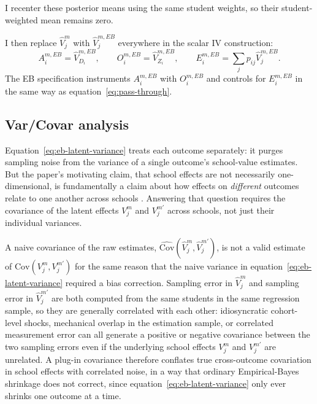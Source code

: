 \documentclass[a4paper, article, english, oneside, unknownkeysallowed, 12pt]{memoir}
\begin{document}
I recenter these posterior means using the same student weights, so their student-weighted mean remains zero.

I then replace $\widehat{V}_j^m$ with $\widehat{V}_{j}^{m,EB}$ everywhere in the scalar IV construction:
\begin{equation}
  A_i^{m,EB} = \widehat{V}_{D_i}^{m,EB},
  \qquad
  O_i^{m,EB} = \widehat{V}_{Z_i}^{m,EB},
  \qquad
  E_i^{m,EB} = \sum_j p_{ij}\widehat{V}_{j}^{m,EB}.
  \label{eq:eb-iv-objects}
\end{equation}
The EB specification instruments $A_i^{m,EB}$ with $O_i^{m,EB}$ and controls for $E_i^{m,EB}$ in the same way as equation~\eqref{eq:pass-through}.


\subsection{Var/Covar analysis}

Equation~\eqref{eq:eb-latent-variance} treats each outcome separately: it purges sampling noise from the variance of a single outcome's school-value estimates.
But the paper's motivating claim, that school effects are not necessarily one-dimensional, is fundamentally a claim about how effects on \emph{different} outcomes relate to one another across schools \parencite{jackson_what_2018, rose_effects_2022}.
Answering that question requires the covariance of the latent effects $V_j^m$ and $V_j^{m'}$ across schools, not just their individual variances.

A naive covariance of the raw estimates, $\widehat{\mathrm{Cov}}\left(\widehat V_j^m, \widehat V_j^{m'}\right)$, is not a valid estimate of $\mathrm{Cov}(V_j^m, V_j^{m'})$ for the same reason that the naive variance in equation~\eqref{eq:eb-latent-variance} required a bias correction.
Sampling error in $\widehat V_j^m$ and sampling error in $\widehat V_j^{m'}$ are both computed from the same students in the same regression sample, so they are generally correlated with each other: idiosyncratic cohort-level shocks, mechanical overlap in the estimation sample, or correlated measurement error can all generate a positive or negative covariance between the two sampling errors even if the underlying school effects $V_j^m$ and $V_j^{m'}$ are unrelated.
A plug-in covariance therefore conflates true cross-outcome covariation in school effects with correlated noise, in a way that ordinary Empirical-Bayes shrinkage does not correct, since equation~\eqref{eq:eb-latent-variance} only ever shrinks one outcome at a time.
\end{document}
